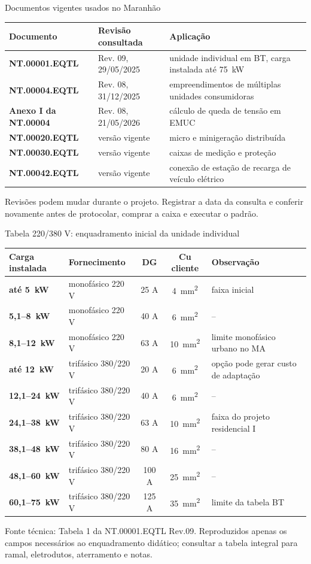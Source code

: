 \begin{frame}[shrink=4]{Documentos vigentes usados no Maranhão}
\scriptsize
\begin{tabularx}{\textwidth}{>{\bfseries}p{2.8cm}p{2.0cm}X}
\toprule
Documento & Revisão consultada & Aplicação \\
\midrule
NT.00001.EQTL & Rev. 09, 29/05/2025 & unidade individual em BT, carga instalada até \SI{75}{kW} \\
NT.00004.EQTL & Rev. 08, 31/12/2025 & empreendimentos de múltiplas unidades consumidoras \\
Anexo I da NT.00004 & Rev. 08, 21/05/2026 & cálculo de queda de tensão em EMUC \\
NT.00020.EQTL & versão vigente & micro e minigeração distribuída \\
NT.00030.EQTL & versão vigente & caixas de medição e proteção \\
NT.00042.EQTL & versão vigente & conexão de estação de recarga de veículo elétrico \\
\bottomrule
\end{tabularx}
\vspace{2mm}
\begin{caixaAt}
Revisões podem mudar durante o projeto. Registrar a data da consulta e conferir novamente antes de protocolar, comprar a caixa e executar o padrão.
\end{caixaAt}
\end{frame}

\begin{frame}[shrink=4]{Tabela 220/380 V: enquadramento inicial da unidade individual}
\scriptsize
\begin{tabularx}{\textwidth}{>{\bfseries}p{2.3cm}p{2.2cm}c c X}
\toprule
Carga instalada & Fornecimento & DG & Cu cliente & Observação \\
\midrule
até \SI{5}{kW} & monofásico 220 V & 25 A & \SI{4}{mm^2} & faixa inicial \\
5,1--\SI{8}{kW} & monofásico 220 V & 40 A & \SI{6}{mm^2} & -- \\
8,1--\SI{12}{kW} & monofásico 220 V & 63 A & \SI{10}{mm^2} & limite monofásico urbano no MA \\
até \SI{12}{kW} & trifásico 380/220 V & 20 A & \SI{6}{mm^2} & opção pode gerar custo de adaptação \\
12,1--\SI{24}{kW} & trifásico 380/220 V & 40 A & \SI{6}{mm^2} & -- \\
24,1--\SI{38}{kW} & trifásico 380/220 V & 63 A & \SI{10}{mm^2} & faixa do projeto residencial I \\
38,1--\SI{48}{kW} & trifásico 380/220 V & 80 A & \SI{16}{mm^2} & -- \\
48,1--\SI{60}{kW} & trifásico 380/220 V & 100 A & \SI{25}{mm^2} & -- \\
60,1--\SI{75}{kW} & trifásico 380/220 V & 125 A & \SI{35}{mm^2} & limite da tabela BT \\
\bottomrule
\end{tabularx}
\vspace{1mm}
\tiny Fonte técnica: Tabela 1 da NT.00001.EQTL Rev.09. Reproduzidos apenas os campos necessários ao enquadramento didático; consultar a tabela integral para ramal, eletrodutos, aterramento e notas.
\end{frame}

